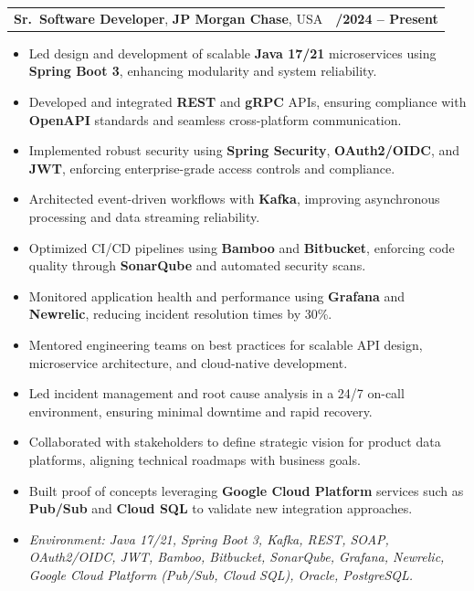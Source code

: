 \documentclass[letterpaper,11pt]{article}
\makeatletter
\newcommand{\resumeItem}[1]{
  \item\footnotesize{
    {#1 \vspace{-2pt}}
  }
}
\newcommand{\resumeSubheading}[4]{
  \vspace{-2pt}\item
    \begin{tabular*}{1.0\textwidth}[t]{l@{\extracolsep{\fill}}r}
      \textbf{\fontsize{10pt}{14pt}\selectfont #3}, \textbf{\fontsize{10pt}{14pt}\selectfont #1}, \fontsize{10pt}{14pt}\selectfont #4 & \textbf{\fontsize{10pt}{14pt}\selectfont #2} \\
    \end{tabular*}\vspace{-7pt}
}
\newcommand{\resumeItemListStart}{\begin{itemize}[leftmargin=*]}
\newcommand{\resumeItemListEnd}{\end{itemize}\vspace{-5pt}}
\makeatother
\begin{document}
\resumeSubheading
{JP Morgan Chase}{09/2024 -- Present}
{Sr.\ Software Developer}{USA}
\resumeItemListStart
  \resumeItem{Led design and development of scalable \textbf{Java 17/21} microservices using \textbf{Spring Boot 3}, enhancing modularity and system reliability.}
  \resumeItem{Developed and integrated \textbf{REST} and \textbf{gRPC} APIs, ensuring compliance with \textbf{OpenAPI} standards and seamless cross-platform communication.}
  \resumeItem{Implemented robust security using \textbf{Spring Security}, \textbf{OAuth2/OIDC}, and \textbf{JWT}, enforcing enterprise-grade access controls and compliance.}
  \resumeItem{Architected event-driven workflows with \textbf{Kafka}, improving asynchronous processing and data streaming reliability.}
  \resumeItem{Optimized CI/CD pipelines using \textbf{Bamboo} and \textbf{Bitbucket}, enforcing code quality through \textbf{SonarQube} and automated security scans.}
  \resumeItem{Monitored application health and performance using \textbf{Grafana} and \textbf{Newrelic}, reducing incident resolution times by 30\%.}
  \resumeItem{Mentored engineering teams on best practices for scalable API design, microservice architecture, and cloud-native development.}
  \resumeItem{Led incident management and root cause analysis in a 24/7 on-call environment, ensuring minimal downtime and rapid recovery.}
  \resumeItem{Collaborated with stakeholders to define strategic vision for product data platforms, aligning technical roadmaps with business goals.}
  \resumeItem{Built proof of concepts leveraging \textbf{Google Cloud Platform} services such as \textbf{Pub/Sub} and \textbf{Cloud SQL} to validate new integration approaches.}
  \resumeItem{\textit{Environment: Java 17/21, Spring Boot 3, Kafka, REST, SOAP, OAuth2/OIDC, JWT, Bamboo, Bitbucket, SonarQube, Grafana, Newrelic, Google Cloud Platform (Pub/Sub, Cloud SQL), Oracle, PostgreSQL.}}
\resumeItemListEnd
\end{document}

